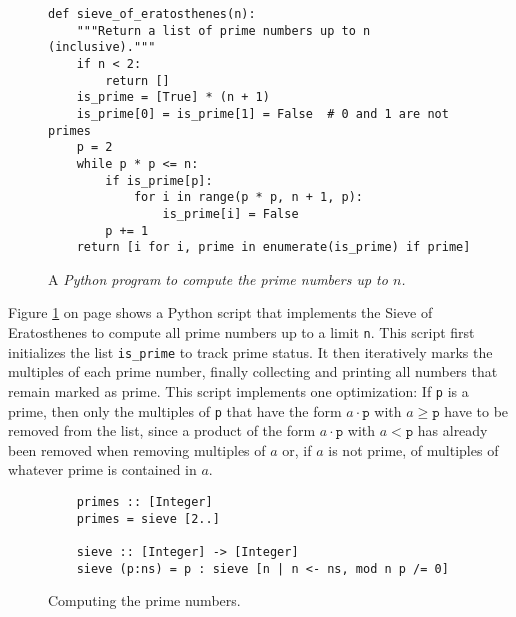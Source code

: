 \documentclass[11pt]{report}
\begin{document}
\begin{figure}[!ht]
\centering
\begin{verbatim}
def sieve_of_eratosthenes(n):
    """Return a list of prime numbers up to n (inclusive)."""
    if n < 2:
        return []    
    is_prime = [True] * (n + 1)
    is_prime[0] = is_prime[1] = False  # 0 and 1 are not primes
    p = 2
    while p * p <= n:
        if is_prime[p]:
            for i in range(p * p, n + 1, p):
                is_prime[i] = False
        p += 1
    return [i for i, prime in enumerate(is_prime) if prime]
\end{verbatim}
\vspace*{-0.3cm}
\caption{A \textsl{Python program to compute the prime numbers up to $n$.}}
\label{fig:primes.py}
\end{figure}
Figure \ref{fig:primes.py} on page \pageref{fig:primes.py} shows a Python script that implements the Sieve of
Eratosthenes to compute all prime numbers up to a limit \texttt{n}.  This script first initializes the list
\texttt{is\_prime} to track prime status. It then iteratively marks the multiples of each prime number, finally
collecting and printing all numbers that remain marked as prime.  This script implements one optimization: If
\texttt{p} is a prime, then only the multiples of \texttt{p} that have the form $a \cdot \mathtt{p}$ with
$a \geq \mathtt{p}$ have to be removed from the list, since a product of the form $a \cdot \mathtt{p}$ with
$a < \mathtt{p}$ has already been removed when removing multiples  
of $a$ or, if $a$ is not prime, of multiples of whatever prime is contained in $a$.



\begin{figure}[!ht]
\centering
\begin{verbatim}
    primes :: [Integer]
    primes = sieve [2..]
    
    sieve :: [Integer] -> [Integer]
    sieve (p:ns) = p : sieve [n | n <- ns, mod n p /= 0]
\end{verbatim}
\vspace*{-0.3cm}
\caption{Computing the prime numbers.}
\label{fig:primes.hs}
\end{figure}
\end{document}
